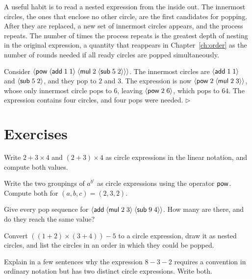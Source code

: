 A useful habit is to read a nested expression from the inside out. The innermost circles, the ones that enclose no other circle, are the first candidates for popping. After they are replaced, a new set of innermost circles appears, and the process repeats. The number of times the process repeats is the greatest depth of nesting in the original expression, a quantity that reappears in Chapter~\ref{ch:order} as the number of rounds needed if all ready circles are popped simultaneously.

\begin{example}
Consider $\langle \mathsf{pow}\; \langle \mathsf{add}\; 1\; 1\rangle\; \langle \mathsf{mul}\; 2\; \langle \mathsf{sub}\; 5\; 2\rangle\rangle\rangle$. The innermost circles are $\langle \mathsf{add}\; 1\; 1\rangle$ and $\langle \mathsf{sub}\; 5\; 2\rangle$, and they pop to $2$ and $3$. The expression is now $\langle \mathsf{pow}\; 2\; \langle \mathsf{mul}\; 2\; 3\rangle\rangle$, whose only innermost circle pops to $6$, leaving $\langle \mathsf{pow}\; 2\; 6\rangle$, which pops to $64$. The expression contains four circles, and four pops were needed. \hfill$\triangleright$
\end{example}

\section*{Exercises}

\begin{exercise}[\dag]\label{ex:ch1-write}
Write $2 + 3 \times 4$ and $(2+3)\times 4$ as circle expressions in the linear notation, and compute both values.
\end{exercise}

\begin{exercise}[\dag]\label{ex:ch1-tower}
Write the two groupings of $a^{b^c}$ as circle expressions using the operator $\mathsf{pow}$. Compute both for $(a,b,c) = (2,3,2)$.
\end{exercise}

\begin{exercise}[\dag]\label{ex:ch1-pops}
Give every pop sequence for $\langle \mathsf{add}\; \langle \mathsf{mul}\; 2\; 3\rangle\; \langle \mathsf{sub}\; 9\; 4\rangle\rangle$. How many are there, and do they reach the same value?
\end{exercise}

\begin{exercise}
Convert $((1+2)\times(3+4)) - 5$ to a circle expression, draw it as nested circles, and list the circles in an order in which they could be popped.
\end{exercise}

\begin{exercise}
Explain in a few sentences why the expression $8 - 3 - 2$ requires a convention in ordinary notation but has two distinct circle expressions. Write both.
\end{exercise}

